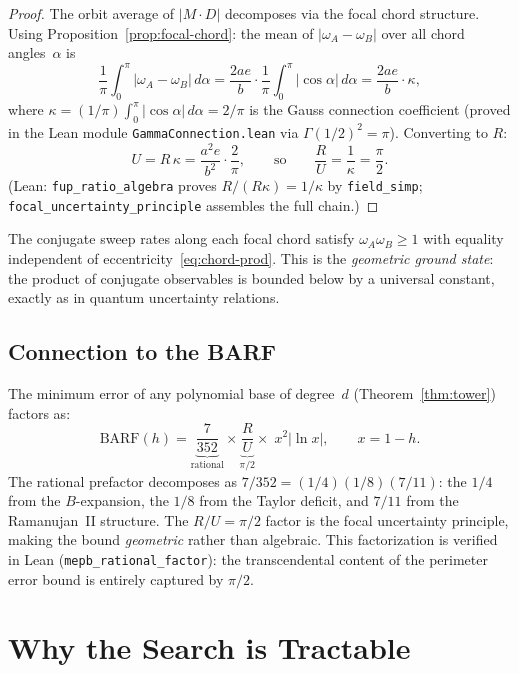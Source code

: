 \documentclass[12pt]{article}
\begin{document}
\begin{proof}
The orbit average of $|M \cdot D|$ decomposes via the focal chord structure. Using Proposition~\ref{prop:focal-chord}: the mean of $|\omega_A - \omega_B|$ over all chord angles~$\alpha$ is
\[
\frac{1}{\pi}\int_0^{\pi}\!|\omega_A - \omega_B|\,d\alpha = \frac{2ae}{b}\cdot\frac{1}{\pi}\int_0^{\pi}\!|\cos\alpha|\,d\alpha = \frac{2ae}{b}\cdot\kappa,
\]
where $\kappa = (1/\pi)\int_0^{\pi}|\cos\alpha|\,d\alpha = 2/\pi$ is the Gauss connection coefficient (proved in the Lean module \texttt{GammaConnection.lean} via $\Gamma(1/2)^2 = \pi$). Converting to $R$:
\[
U = R\,\kappa = \frac{a^2 e}{b^2}\cdot\frac{2}{\pi}, \qquad\text{so}\qquad \frac{R}{U} = \frac{1}{\kappa} = \frac{\pi}{2}.
\]
(Lean: \texttt{fup\_ratio\_algebra} proves $R/(R\kappa) = 1/\kappa$ by \texttt{field\_simp}; \texttt{focal\_uncertainty\_principle} assembles the full chain.)
\end{proof}

\noindent The conjugate sweep rates along each focal chord satisfy $\omega_A\omega_B \geq 1$ with equality independent of eccentricity~\eqref{eq:chord-prod}. This is the \emph{geometric ground state}: the product of conjugate observables is bounded below by a universal constant, exactly as in quantum uncertainty relations.

\subsection{Connection to the BARF}

The minimum error of any polynomial base of degree~$d$ (Theorem~\ref{thm:tower}) factors as:
\begin{equation}\label{eq:mepb-factor}
\text{BARF}(h) = \underbrace{\frac{7}{352}}_{\text{rational}} \times \underbrace{\frac{R}{U}}_{\pi/2} \times\; x^2|\!\ln x|, \qquad x = 1-h.
\end{equation}
The rational prefactor decomposes as $7/352 = (1/4)(1/8)(7/11)$: the $1/4$ from the $B$-expansion, the $1/8$ from the Taylor deficit, and $7/11$ from the Ramanujan~II structure. The $R/U = \pi/2$ factor is the focal uncertainty principle, making the bound \emph{geometric} rather than algebraic. This factorization is verified in Lean (\texttt{mepb\_rational\_factor}): the transcendental content of the perimeter error bound is entirely captured by $\pi/2$.

\section{Why the Search is Tractable}\label{sec:varpro}
\end{document}
